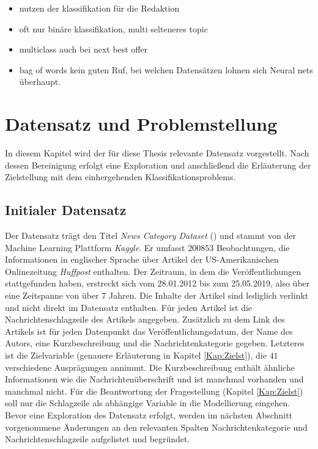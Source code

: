 \documentclass[a4paper,11pt]{article}
\begin{document}
\begin{itemize}
    \item nutzen der klassifikation für die Redaktion
    \item oft nur binäre klassifikation, multi selteneres topic
    \item multiclass auch bei next best offer
    \item bag of words kein guten Ruf, bei welchen Datensätzen lohnen sich Neural nets überhaupt.
\end{itemize}{}

\section{Datensatz und Problemstellung}

In diesem Kapitel wird der für diese Thesis relevante Datensatz vorgestellt. Nach dessen Bereinigung erfolgt eine Exploration und anschließend die Erläuterung der Zielstellung mit dem einhergehenden Klassifikationsproblems.


\subsection{Initialer Datensatz}

Der Datensatz trägt den Titel \textit{News Category Dataset} (\cite{dataset}) und stammt von der Machine Learning Plattform \textit{Kaggle}. Er umfasst $200853$ Beobachtungen, die Informationen in englischer Sprache über Artikel der US-Amerikanischen Onlinezeitung \textit{Huffpost} enthalten. Der Zeitraum, in dem die Veröffentlichungen stattgefunden haben, erstreckt sich vom 28.01.2012 bis zum 25.05.2019, also über eine Zeitspanne von über $7$ Jahren. Die Inhalte der Artikel sind lediglich verlinkt und nicht direkt im Datensatz enthalten. Für jeden Artikel ist die Nachrichtenschlagzeile des Artikels angegeben. Zusätzlich zu dem Link des Artikels ist für jeden Datenpunkt das Veröffentlichungsdatum, der Name des Autors, eine Kurzbeschreibung und die Nachrichtenkategorie gegeben. Letzteres ist die Zielvariable (genauere Erläuterung in Kapitel \ref{Kap:Zielst}), die $41$ verschiedene Ausprägungen annimmt. Die Kurzbeschreibung enthält ähnliche Informationen wie die Nachrichtenüberschrift und ist manchmal vorhanden und manchmal nicht. Für die Beantwortung der Fragestellung (Kapitel \ref{Kap:Zielst}) soll nur die Schlagzeile als abhängige Variable in die Modellierung eingehen. Bevor eine Exploration des Datensatz erfolgt, werden im nächsten Abschnitt vorgenommene Änderungen an den relevanten Spalten Nachrichtenkategorie und Nachrichtenschlagzeile aufgelistet und begründet.
\end{document}
